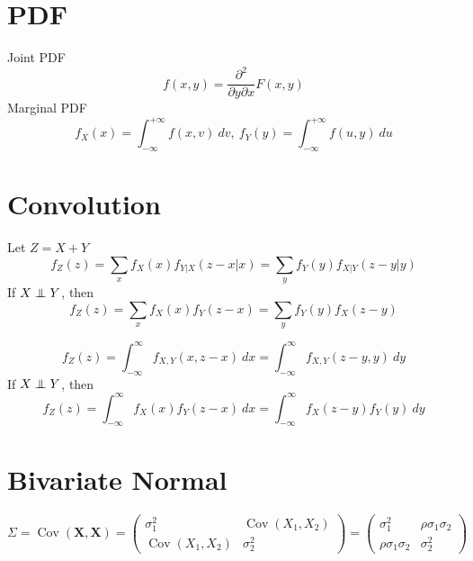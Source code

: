 \documentclass[twocolumn]{amsart}
\newcommand{\Cov}{\operatorname{Cov}}
\newcommand\independent{\protect\mathpalette{\protect\independenT}{\perp}}
\def\independenT#1#2{\mathrel{\rlap{$#1#2$}\mkern3mu{#1#2}}}
\begin{document}
\section*{PDF}
Joint PDF
\begin{equation*}
  f(x,y) = \frac{\partial^{2}}{\partial y \partial x}F(x,y)
\end{equation*}
Marginal PDF
\begin{equation*}
  f_{X}(x) = \int_{-\infty}^{+\infty} f(x,v)~dv,~f_{Y}(y) = \int_{-\infty}^{+\infty} f(u,y)~du
\end{equation*}

\section*{Convolution}
Let $Z=X+Y$
\begin{equation*}
  f_{Z}(z)=\sum_{x}f_{X}(x)f_{Y|X}(z-x|x) = \sum_{y}f_{Y}(y)f_{X|Y}(z-y|y)
\end{equation*}
If \(X \independent Y\), then
\begin{equation*}
  f_{Z}(z)=\sum_{x}f_{X}(x)f_{Y}(z-x) = \sum_{y}f_{Y}(y)f_{X}(z-y)
\end{equation*}

\begin{equation*}
  f_{Z}(z)=\int_{-\infty}^{\infty}f_{X,Y}(x,z-x)~dx = \int_{-\infty}^{\infty}f_{X,Y}(z-y,y)~dy
\end{equation*}
If \(X \independent Y\), then
\begin{equation*}
  f_{Z}(z)=\int_{-\infty}^{\infty}f_{X}(x)f_{Y}(z-x)~dx = \int_{-\infty}^{\infty}f_{X}(z-y)f_{Y}(y)~dy
\end{equation*}

\section*{Bivariate Normal}
\begin{equation*}
  \Sigma = \Cov(\boldsymbol{X},\boldsymbol{X})
  = \begin{pmatrix}
    \sigma_{1}^{2}&\Cov(X_{1},X_{2})\\
      \Cov(X_{1},X_{2})&\sigma_{2}^{2}
  \end{pmatrix}
  = \begin{pmatrix}
    \sigma_{1}^{2}&\rho\sigma_{1}\sigma_{2}\\
      \rho\sigma_{1}\sigma_{2}&\sigma_{2}^{2}
  \end{pmatrix}
\end{equation*}
\end{document}
